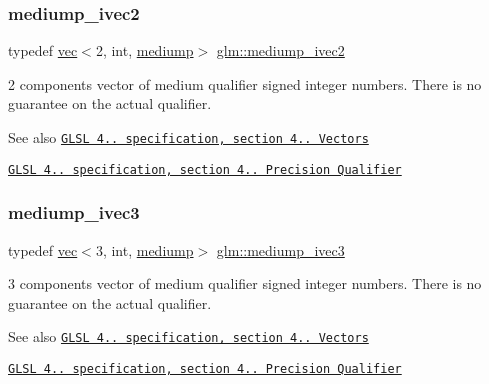 \subsubsection{\texorpdfstring{mediump\+\_\+ivec2}{mediump\_ivec2}}
{\footnotesize\ttfamily typedef \hyperlink{structglm_1_1vec}{vec}$<$2, int, \hyperlink{namespaceglm_a36ed105b07c7746804d7fdc7cc90ff25a6416f3ea0c9025fb21ed50c4d6620482}{mediump}$>$ \hyperlink{group__core__precision_ga0efcfa6750f1c7197ff1c3390521ffd7}{glm\+::mediump\+\_\+ivec2}}

2 components vector of medium qualifier signed integer numbers. There is no guarantee on the actual qualifier.

\begin{DoxySeeAlso}{See also}
\href{http://www.opengl.org/registry/doc/GLSLangSpec.4.20.8.pdf}{\tt G\+L\+SL 4.. specification, section 4.. Vectors} 

\href{http://www.opengl.org/registry/doc/GLSLangSpec.4.20.8.pdf}{\tt G\+L\+SL 4.. specification, section 4.. Precision Qualifier} 
\end{DoxySeeAlso}
\mbox{\label{group__core__precision_ga33f150e1d55aa6c91927cb0431bf0708}} 
\subsubsection{\texorpdfstring{mediump\+\_\+ivec3}{mediump\_ivec3}}
{\footnotesize\ttfamily typedef \hyperlink{structglm_1_1vec}{vec}$<$3, int, \hyperlink{namespaceglm_a36ed105b07c7746804d7fdc7cc90ff25a6416f3ea0c9025fb21ed50c4d6620482}{mediump}$>$ \hyperlink{group__core__precision_ga33f150e1d55aa6c91927cb0431bf0708}{glm\+::mediump\+\_\+ivec3}}

3 components vector of medium qualifier signed integer numbers. There is no guarantee on the actual qualifier.

\begin{DoxySeeAlso}{See also}
\href{http://www.opengl.org/registry/doc/GLSLangSpec.4.20.8.pdf}{\tt G\+L\+SL 4.. specification, section 4.. Vectors} 

\href{http://www.opengl.org/registry/doc/GLSLangSpec.4.20.8.pdf}{\tt G\+L\+SL 4.. specification, section 4.. Precision Qualifier} 
\end{DoxySeeAlso}
\mbox{\label{group__core__precision_gada31c3570b58a80e616c7245726a210d}} 
